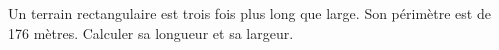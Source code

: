 Un terrain rectangulaire est trois fois plus long que large. 
Son périmètre est de 176 mètres. Calculer sa longueur et sa largeur.